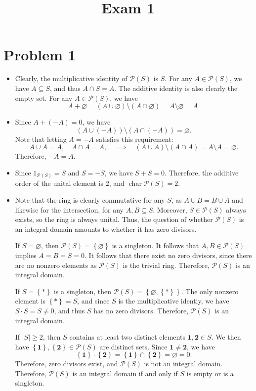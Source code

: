 \documentclass[11pt, letterpaper]{article}
\title{Exam 1}
\begin{document}
\makeproblem
\section*{Problem 1}
\begin{itemize}
	\item Clearly, the multiplicative identity of $\mathcal{P} (S)$ is $S$. For any $A\in \mathcal{P} (S)$, we have $A\subseteq S$, and thus $A \cap S =A$. The additive identity is also clearly the empty set. For any $A\in \mathcal{P} (S)$, we have
		\[
			A+\varnothing =(A \cup \varnothing )\setminus (A \cap \varnothing )=A \setminus \varnothing =A
		.\]
	\item Since $A+(-A)=0$, we have
		\[
			\left( A\cup (-A) \right) \setminus \left( A \cap (-A) \right) =\varnothing 
		.\]
		Note that letting $A=-A$ satisfies this requirement:
		\[
			A \cup A=A,\quad A \cap A=A,\quad \implies \quad \left( A \cup A \right) \setminus \left( A \cap A \right) =A\setminus A=\varnothing 
		.\]
		Therefore, $-A=A$.
	\item Since $1_{\mathcal{P} (S)} =S$ and $S=-S$, we have $S+S=0$. Therefore, the additive order of the unital element is $2$, and $\operatorname{char} \mathcal{P} (S)=2$.
	\item Note that the ring is clearly commutative for any $S$, as $A \cup B=B\cup A$ and likewise for the intersection, for any $A,B\subseteq S$. Moreover, $S\in \mathcal{P} (S)$ always exists, so the ring is always unital. Thus, the question of whether $\mathcal{P} (S)$ is an integral domain amounts to whether it has zero divisors.

		If $S=\varnothing $, then $\mathcal{P} (S)=\left\{ \varnothing  \right\} $ is a singleton. It follows that $A,B\in \mathcal{P} (S)$ implies $A=B=S=0$. It follows that there exist no zero divisors, since there are no nonzero elements as $\mathcal{P} (S)$ is the trivial ring. Therefore, $\mathcal{P} (S)$ is an integral domain.

		If $S=\left\{ * \right\} $ is a singleton, then $\mathcal{P} (S)=\left\{ \varnothing ,\left\{ * \right\}  \right\} $. The only nonzero element is $\left\{ * \right\} =S$, and since $S$ is the multiplicative identiy, we have $S\cdot S=S\neq 0$, and thus $S$ has no zero divisors. Therefore, $\mathcal{P} (S)$ is an integral domain.

		If $\left| S \right| \geq 2$, then $S$ contains at least two distinct elements $\mathbf{1} ,\mathbf{2} \in S$. We then have $\left\{ \mathbf{1}  \right\} ,\left\{ \mathbf{2}  \right\} \in \mathcal{P} (S)$ are distinct sets. Since $\mathbf{1} \neq \mathbf{2} $, we have
		\[
			\left\{ \mathbf{1}  \right\} \cdot \left\{ \mathbf{2}  \right\} =\left\{ \mathbf{1}  \right\} \cap \left\{ \mathbf{2}  \right\} =\varnothing =0
		.\]
	Therefore, zero divisors exist, and $\mathcal{P} (S)$ is not an integral domain.	
	Therefore, $\mathcal{P} (S)$ is an integral domain if and only if $S$ is empty or is a singleton.
\end{itemize}
\end{document}
